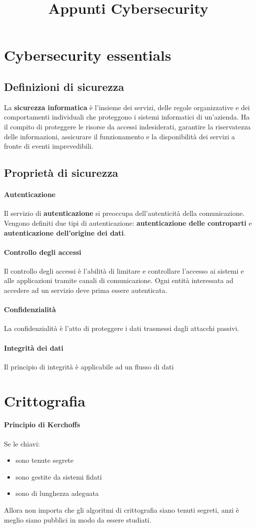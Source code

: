 \documentclass[11pt]{article}
\title{Appunti Cybersecurity}
\begin{document}
\section{Cybersecurity essentials}
\subsection{Definizioni di sicurezza}
La \textbf{sicurezza informatica} è l'insieme dei servizi, delle regole organizzative e dei comportamenti individuali che proteggono 
i sistemi informatici di un'azienda. Ha il compito di proteggere le risorse da accessi indesiderati, garantire la riservatezza 
delle informazioni, assicurare il funzionamento e la disponibilità dei servizi a fronte di eventi imprevedibili.
\subsection{Proprietà di sicurezza}
\paragraph*{Autenticazione}
Il servizio di \textbf{autenticazione} si preoccupa dell'autenticità della comunicazione. Vengono definiti due tipi di 
autenticazione: \textbf{autenticazione delle controparti} e \textbf{autenticazione dell'origine dei dati}.
\paragraph*{Controllo degli accessi}
Il controllo degli accessi è l'abilità di limitare e controllare l'accesso ai sistemi e alle applicazioni tramite canali
di comunicazione. Ogni entità interessata ad accedere ad un servizio deve prima essere autenticata.
\paragraph*{Confidenzialità}
La confidenzialità è l'atto di proteggere i dati trasmessi dagli attacchi passivi. 
\paragraph*{Integrità dei dati}
Il principio di integrità è applicabile ad un flusso di dati

\section{Crittografia}
\paragraph*{Principio di Kerchoffs}
Se le chiavi:
\begin{itemize}
    \item sono tenute segrete 
    \item sono gestite da sistemi fidati 
    \item sono di lunghezza adeguata
\end{itemize}
Allora non importa che gli algoritmi di crittografia siano tenuti segreti, anzi è meglio siano pubblici in modo da essere 
studiati.
\end{document}
